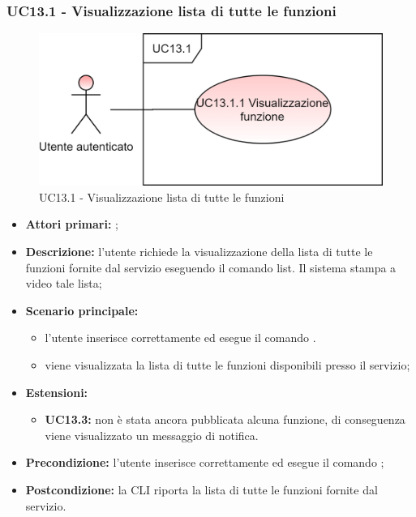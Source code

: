 \subsubsection{UC13.1 -  Visualizzazione lista di tutte le funzioni}
\begin{figure}[H]
	\centering
	\includegraphics[scale=\ucs]{./res/img/UC13.1.png}
	\caption {UC13.1 -  Visualizzazione lista di tutte le funzioni}
\end{figure}
\begin{itemize}
	\item \textbf{Attori primari:} \ua{};
	\item \textbf{Descrizione:} l’utente richiede la visualizzazione della lista di tutte le funzioni fornite dal servizio eseguendo il comando list. Il sistema stampa a video tale lista; 
	\item \textbf{Scenario principale:} 
	\begin{itemize}
		\item l'utente inserisce correttamente ed esegue il comando \lista{}. 
		\item viene visualizzata la lista di tutte le funzioni disponibili presso il servizio;
	\end{itemize}
	\item \textbf{Estensioni:} 
	\begin{itemize}
		\item \textbf{UC13.3:} non è stata ancora pubblicata alcuna funzione, di conseguenza viene visualizzato un messaggio di notifica. 
	\end{itemize}
	\item \textbf{Precondizione:} l'utente inserisce correttamente ed esegue il comando \lista{};
	\item \textbf{Postcondizione:} la CLI riporta la lista di tutte le funzioni fornite dal servizio.
\end{itemize}